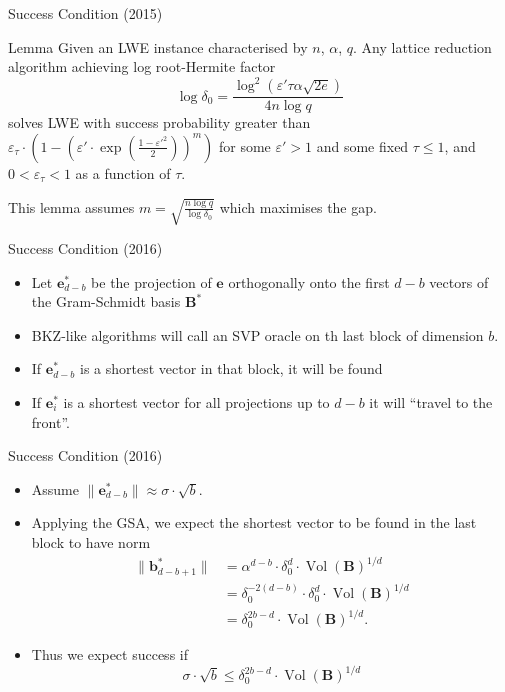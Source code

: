 \documentclass[presentation,smaller]{beamer}
\renewcommand{\vec}[1]{\mathbf{#1}\xspace}
\newcommand{\mat}[1]{\mathbf{#1}\xspace}
\DeclareMathOperator{\Vol}{Vol}
\begin{document}
\begin{frame}[label={sec:org33f8bf4}]{Success Condition (2015)}
\begin{block}{Lemma }
Given an LWE instance characterised by \(n\), \(α\), \(q\). Any lattice reduction algorithm achieving log root-Hermite factor \[\log{δ_0} = \frac{\log^2{\left(ε' τ α \sqrt{2e}\right)}}{4 n \log{q}}\] solves LWE with success probability greater than \(ε_τ ⋅ \left( 1-\left(ε' ⋅  \exp{\left(\frac{1-ε'^2}{2}\right)}\right)^m \right)\) for some \(ε' > 1\) and some fixed \(τ ≤ 1\), and \(0 < ε_τ < 1\) as a function of \(τ\).
\end{block}

This lemma assumes \(m = \sqrt{\frac{n \log q}{\log δ_0}}\) which maximises the gap.
\end{frame}

\begin{frame}[label={sec:org9183b57}]{Success Condition (2016)}
\begin{itemize}
\item Let \(\vec{e}^*_{d-b}\) be the projection of \(\vec{e}\) orthogonally onto the first \(d-b\) vectors of the Gram-Schmidt basis \(\mat{B}^*\)
\item BKZ-like algorithms will call an SVP oracle on th last block of dimension \(b\).
\item If \(\vec{e}^*_{d-b}\) is a shortest vector in that block, it will be found
\item If \(\vec{e}^*_i\) is a shortest vector for all projections up to \(d-b\) it will “travel to the front”.
\end{itemize}
\end{frame}

\begin{frame}[label={sec:org4f0a685}]{Success Condition (2016)}
\begin{itemize}
\item Assume \(\|\vec{e}^*_{d-b}\| ≈ σ ⋅ \sqrt{b}\).
\item Applying the GSA, we expect the shortest vector to be found in the last block to have norm
\begin{align*}
 \|\vec{b}_{d-b+1}^*\| &=  α^{d-b} ⋅ δ_0^d ⋅ {\Vol(\mat{B})}^{1/d}\\
                       &= δ_0^{-2(d-b)} ⋅ δ_0^d ⋅ {\Vol(\mat{B})}^{1/d}\\
                       &= δ_0^{2b-d} ⋅ {\Vol(\mat{B})}^{1/d}.
\end{align*}
\item Thus  we expect success if \[σ ⋅ \sqrt{b} ≤ δ_0^{2b-d} ⋅ {\Vol(\mat{B})}^{1/d}\]
\end{itemize}
\end{frame}
\end{document}
